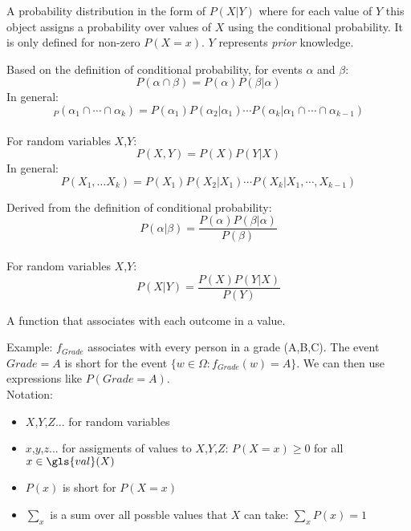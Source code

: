 {%
  A \gls{probability distribution} in the form of $P(X|Y)$ where for each value of $Y$ this object assigns a probability over values of $X$ using the \gls{conditional probability}. It is only defined for non-zero $P(X=x)$. $Y$ represents \textit{prior} knowledge.
}


{%
  Based on the definition of \gls{conditional probability}, for events $\alpha$ and $\beta$:
  \begin{equation*}
    P(\alpha\cap\beta)=P(\alpha)P(\beta|\alpha)
  \end{equation*}
  In general:
  \begin{equation*}
    _P(\alpha_1\cap\cdots\cap\alpha_k)=P(\alpha_1)P(\alpha_2|\alpha_1)\cdots P(\alpha_k|\alpha_1\cap\cdots\cap\alpha_{k-1})
  \end{equation*}\\[0.1cm]
  For \glspl{random variable} $X$,$Y$:
  \begin{equation*}
    P(X,Y)=P(X)P(Y|X)
  \end{equation*}
  In general:
  \begin{equation*}
    P(X_1,\dots X_k)=P(X_1)P(X_2|X_1)\cdots P(X_k|X_1,\cdots,X_{k-1})
  \end{equation*}

}

{%
  Derived from the definition of \gls{conditional probability}:
  \begin{equation*}
    P(\alpha|\beta)=\frac{P(\alpha)P(\beta|\alpha)}{P(\beta)}
  \end{equation*}\\[0.1cm]

  For \glspl{random variable} $X$,$Y$:
  \begin{equation*}
    P(X|Y)=\frac{P(X)P(Y|X)}{P(Y)}
  \end{equation*}
}

{%
  A function that associates with each outcome in  a value.

  Example: $f_{Grade}$ associates with every person in  a grade (A,B,C). The event $Grade=A$ is short for the event $\{w\in\Omega:f_{Grade}(w)=A\}$. We can then use expressions like $P(Grade=A)$.\\

  Notation:
  \begin{itemize}
    \item $X$,$Y$,$Z$... for random variables
    \item $x$,$y$,$z$... for assigments of values to  $X$,$Y$,$Z$: $P(X=x)\geq0 $ for all $x\in \gls{val}(X)$
    \item $P(x)$ is short for $P(X=x)$
    \item $\sum_x$ is a sum over all possble values that $X$ can take: $\sum_xP(x)=1$
  \end{itemize}
}

